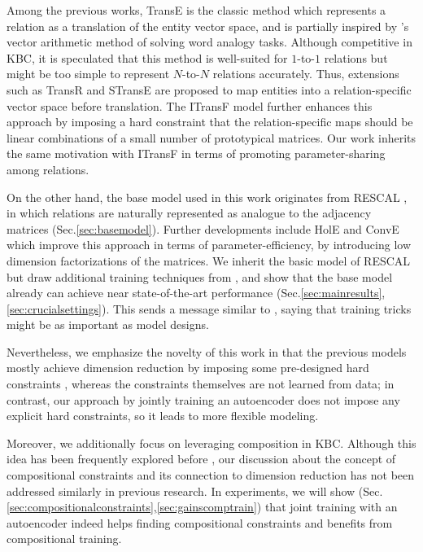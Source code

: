 \documentclass[11pt,a4paper]{article}
\begin{document}
Among the previous works, TransE \cite{DBLP:conf/nips/BordesUGWY13} is the 
classic method which represents a relation as a translation of the entity 
vector space, and is partially inspired by \citet{mikolov-yih-zweig:2013:NAACL-HLT}'s vector arithmetic method of 
solving word analogy tasks. Although competitive in KBC, it is speculated that 
this method is well-suited for $1$-to-$1$ relations but might be too 
simple to represent $N$-to-$N$ relations 
accurately\cite{DBLP:journals/tkde/WangMWG17}. Thus, extensions such as 
TransR \cite{DBLP:conf/aaai/LinLSLZ15} and STransE \cite{nguyen-EtAl:2016:N16-1} 
are proposed to map entities into a relation-specific vector space before 
translation. The ITransF model \cite{xie-EtAl:2017:Long} further enhances this 
approach by imposing a hard constraint that the relation-specific maps should be 
linear combinations of a small number of prototypical matrices. Our work 
inherits the same motivation with ITransF in terms of 
promoting parameter-sharing among relations. 

On the other hand, the base model used in this work originates from 
RESCAL \cite{Nickel:2011:TMC:3104482.3104584}, in which relations are 
naturally represented as analogue to the adjacency matrices 
(Sec.\ref{sec:basemodel}). Further 
developments include HolE \cite{DBLP:conf/aaai/NickelRP16} and 
ConvE \cite{dettmers2018conve} which improve this approach in terms of 
parameter-efficiency, by introducing low dimension factorizations of the 
matrices. We inherit the basic model of RESCAL but draw 
additional training techniques from \citet{tian-okazaki-inui:2016:P16-1}, and 
show that the base model already can achieve near 
state-of-the-art performance (Sec.\ref{sec:mainresults},\ref{sec:crucialsettings}). This sends a message 
similar to \citet{kadlec-bajgar-kleindienst:2017:RepL4NLP}, saying that 
training tricks might be as important as model designs.

Nevertheless, we emphasize the novelty of this work in that the previous 
models mostly achieve dimension reduction by imposing some pre-designed 
hard constraints \citep{DBLP:conf/nips/BordesUGWY13,Yang2015,DBLP:conf/icml/TrouillonWRGB16,DBLP:conf/aaai/NickelRP16,xie-EtAl:2017:Long,dettmers2018conve}, whereas the 
constraints themselves are not learned from data; in contrast, 
our approach by jointly training an autoencoder does not impose 
any explicit hard constraints, so it leads to more flexible modeling. 

Moreover, we additionally focus on leveraging composition in KBC. Although 
this idea has been frequently explored 
before \citep{guu-miller-liang:2015:EMNLP,neelakantan-roth-mccallum:2015:ACL-IJCNLP,lin-EtAl:2015:EMNLP1}, our discussion about the concept of 
compositional constraints and its connection to dimension reduction 
has not been addressed similarly in previous research. In experiments, we will 
show (Sec.\ref{sec:compositionalconstraints},\ref{sec:gainscomptrain}) 
that joint training 
with an autoencoder indeed helps finding compositional constraints and 
benefits from compositional training.
\end{document}
